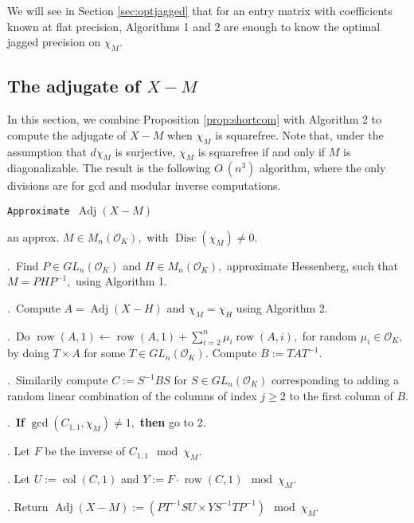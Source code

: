 \documentclass{sig-alternate-05-2015}
\DeclareMathOperator{\adj}{Adj}
\DeclareMathOperator{\disc}{Disc}
\DeclareMathOperator{\row}{row}
\DeclareMathOperator{\col}{col}
\newcommand{\OK}{\mathcal{O}_K}
\newcommand{\softO}{O\tilde{~}}
\begin{document}
We will see in Section \ref{sec:optjagged} that for an
entry matrix with coefficients known at flat precision,
Algorithms 1 and 2 are enough to
know the optimal jagged precision on $\chi_M.$

\subsection{The adjugate of $X{-}M$}

In this section, we combine Proposition \ref{prop:shortcom}
with Algorithm 2 to compute the adjugate of $X-M$
when $\chi_M$ is squarefree.   Note that, under
the assumption that $d\chi_M$ is surjective,
$\chi_M$ is squarefree if and only if $M$ is diagonalizable.  The result is
the following $\softO(n^3)$ algorithm, where the only
divisions are for gcd and modular inverse computations.

\noindent\hrulefill

 {\tt Approximate $\adj (X{-}M)$ }

 an approx. $M \in M_n(\OK),$ with $\disc(\chi_M) \neq 0.$ 

\smallskip

.\ Find $P \in GL_n(\OK)$ and $H \in M_n(\OK),$ approximate Hessenberg,
such that $M=PHP^{-1},$ using Algorithm 1. 

.\ Compute $A=\adj (X-H)$ and $\chi_M = \chi_H$ using Algorithm 2.


.\ Do $\row(A,1) \leftarrow \row(A,1)+\sum_{i=2}^n \mu_i \row(A,i),$ for
random $\mu_i \in \OK,$ by doing $T \times A$ for some $T \in GL_n(\OK).$
Compute $B:=TAT^{-1}.$

.\ Similarily compute $C:=S^{-1}BS$ for $S \in GL_n(\OK)$ corresponding to
adding a random linear combination of the columns of index $j \ge 2$
to the first column of $B.$ 

.\  \textbf{If} $\gcd(C_{1,1}, \chi_M) \neq 1,$ \textbf{then} go to 2.

. Let $F$ be the inverse of $C_{1,1} \mod \chi_M$.

. Let $U := \col(C,1)$ and $Y := F \cdot \row(C,1) \mod \chi_M$.

. Return $\adj(X-M):=(PT^{-1}S U \times Y S^{-1} T P^{-1}) \mod \chi_M.$

\vspace{-1ex}\noindent\hrulefill

\medskip
\end{document}
